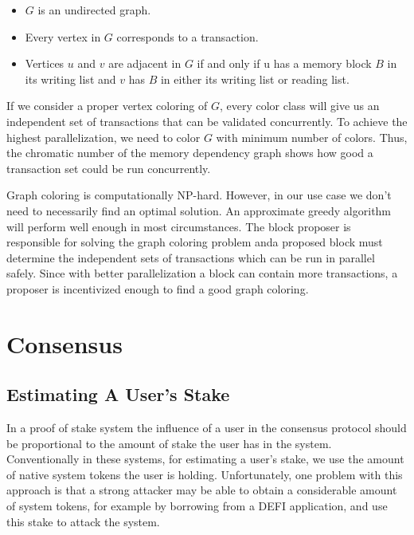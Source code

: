 \documentclass[11pt, A4]{report}
\begin{document}
    \begin{itemize}
        \item \(G\) is an undirected graph.
        \item Every vertex in \(G\) corresponds to a transaction.
        \item Vertices \(u\) and \(v\) are adjacent in \(G\) if and only if u has a memory block \(B\) in its writing
        list and \(v\) has \(B\) in either its writing list or reading list.
    \end{itemize}

    If we consider a proper vertex coloring of \(G\), every color class will give us an independent set of
    transactions that can be validated concurrently. To achieve the highest parallelization, we need to color \(G\)
    with minimum number of colors. Thus, the chromatic number of the memory dependency graph shows how good a
    transaction set could be run concurrently.

    Graph coloring is computationally NP-hard. However, in our use case we don't need to necessarily find an optimal
    solution. An approximate greedy algorithm will perform well enough in most circumstances. The block proposer is
    responsible for solving the graph coloring problem anda proposed block must determine the independent sets of
    transactions which can be run in parallel safely. Since with better parallelization a block can contain more
    transactions, a proposer is incentivized enough to find a good graph coloring.


    \section{Consensus}\label{sec:consensus}

    \subsection{Estimating A User's Stake}\label{subsec:estimating-a-user's-stake}

    In a proof of stake system the influence of a user in the consensus protocol should be proportional to the amount
    of stake the user has in the system. Conventionally in these systems, for estimating a user's stake, we use the
    amount of native system tokens the user is holding. Unfortunately, one problem with this approach is that a
    strong attacker may be able to obtain a considerable amount of system tokens, for example by borrowing from a
    DEFI application, and use this stake to attack the system.
\end{document}
